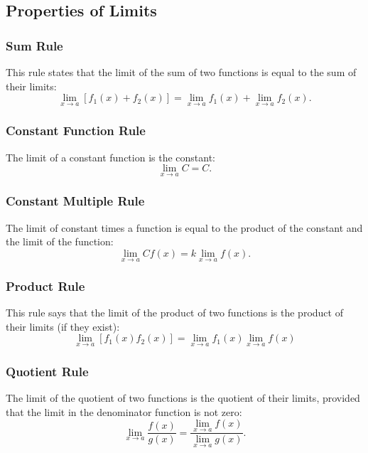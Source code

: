 \documentclass[
]{book}
\begin{document}
\hypertarget{properties-of-limits}{%
\subsection{Properties of Limits}\label{properties-of-limits}}

\hypertarget{sum-rule}{%
\subsubsection{Sum Rule}\label{sum-rule}}

This rule states that the limit of the sum of two functions is equal to the sum of their limits:
\[
\lim_{x\to a}[f_1(x) + f_2(x) ] = \lim_{x\to a}f_1(x) + \lim_{x\to a}f_2(x).
\]

\hypertarget{constant-function-rule}{%
\subsubsection{Constant Function Rule}\label{constant-function-rule}}

The limit of a constant function is the constant: \[\lim_{x\to a} C = C.\]

\hypertarget{constant-multiple-rule}{%
\subsubsection{Constant Multiple Rule}\label{constant-multiple-rule}}

The limit of constant times a function is equal to the product of the constant and the limit of the function: \[
\lim_{x\to a}Cf(x) = k\lim_{x\to a}f(x).
\]

\hypertarget{product-rule}{%
\subsubsection{Product Rule}\label{product-rule}}

This rule says that the limit of the product of two functions is the product of their limits (if they exist): \[
\lim_{x\to a}[f_1(x)f_2(x)] = \lim_{x\to a}f_1(x)\lim_{x\to a}f(x)
\]

\hypertarget{quotient-rule}{%
\subsubsection{Quotient Rule}\label{quotient-rule}}

The limit of the quotient of two functions is the quotient of their limits, provided that the limit in the denominator function is not zero:
\[
\lim_{x\to a}\frac{f(x)}{g(x)} = \frac{\lim_{x\to a}f(x)}{\lim_{x\to a}g(x)}.
\]
\end{document}
